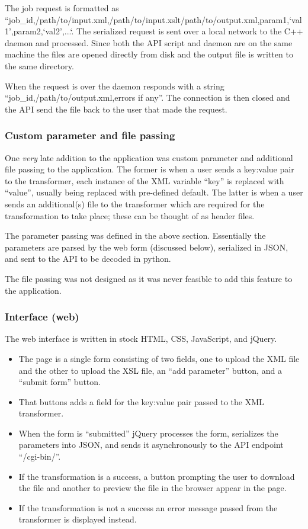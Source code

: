 The job request is formatted as ``job\_id,/path/to/input.xml,/path/to/input.xslt/path/to/output.xml,param1,`val1',param2,`val2',...`.
The serialized request is sent over a local network to the C++ daemon and processed.
Since both the API script and daemon are on the same machine the files are opened directly from disk and the output file is written to the same directory.

When the request is over the daemon responds with a string ``job\_id,/path/to/output.xml,errors if any''.
The connection is then closed and the API send the file back to the user that made the request.

\subsubsection{Custom parameter and file passing}

One \textit{very} late addition to the application was custom parameter and additional file passing to the application.
The former is when a user sends a key:value pair to the transformer, each instance of the XML variable ``key'' is replaced with ``value'', usually being replaced with pre-defined default.
The latter is when a user sends an additional(s) file to the transformer which are required for the transformation to take place; these can be thought of as header files.

The parameter passing was defined in the above section.
Essentially the parameters are parsed by the web form (discussed below), serialized in JSON, and sent to the API to be decoded in python.

The file passing was not designed as it was never feasible to add this feature to the application.

\subsubsection{Interface (web)}

The web interface is written in stock HTML, CSS, JavaScript, and jQuery.

\begin{itemize}
  \item The page is a single form consisting of two fields, one to upload the XML file and the other to upload the XSL file, an ``add parameter'' button, and a ``submit form'' button.
  \item That buttons adds a field for the key:value pair passed to the XML transformer.
  \item When the form is ``submitted'' jQuery processes the form, serializes the parameters into JSON, and sends it asynchronously to the API endpoint ``/cgi-bin/''.
  \item If the transformation is a success, a button prompting the user to download the file and another to preview the file in the browser appear in the page.
  \item If the transformation is not a success an error message passed from the transformer is displayed instead.
\end{itemize}

